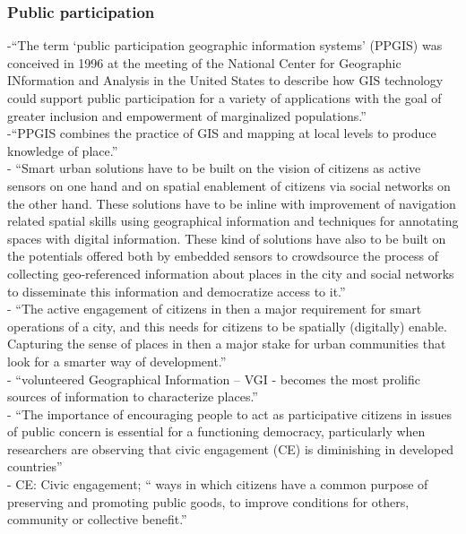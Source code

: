 \subsubsection{Public participation}
-{\color{orange}“The term ‘public participation geographic information systems’ (PPGIS) was conceived in 1996 at the meeting of the National Center for Geographic INformation and Analysis in the United States to describe how GIS technology could support public participation for a variety of applications with the goal of greater inclusion and empowerment of marginalized populations.”\cite{Brown2012}}\\
-{\color{orange}“PPGIS combines the practice of GIS and mapping at local levels to produce knowledge of place.”\cite{Brown2012}}\\
- {\color{orange}“Smart urban solutions have to be built on the vision of citizens as active sensors on one hand and on spatial enablement of citizens via social networks on the other hand. These solutions have to be inline with improvement of navigation related spatial skills using geographical information and techniques for annotating spaces with digital information. These kind of solutions have also to be built on the potentials offered both by embedded sensors to crowdsource the process of collecting geo-referenced information about places in the city and social networks to disseminate this information and democratize access to it.”} \cite{Roche2012}\\
- {\color{orange} “The active engagement of citizens in then a major requirement for smart operations of a city, and this needs for citizens to be spatially (digitally) enable. Capturing the sense of places in then a major stake for urban communities that look for a smarter way of development.”} \cite{Roche2012}\\
- {\color{orange}“volunteered Geographical Information -- VGI - becomes the most prolific sources of information to characterize places.”} \cite{Roche2012}\\
-{\color{red} “The importance of encouraging people to act as participative citizens in issues of public concern is essential for a functioning democracy, particularly when researchers are observing that civic engagement (CE) is diminishing in developed countries”} \cite{Acedo2019}\\
-{\color{orange} CE: Civic engagement; “ ways in which citizens have a common purpose of preserving and promoting public goods, to improve conditions for others, community or collective benefit.” } \cite{Acedo2019}\\
